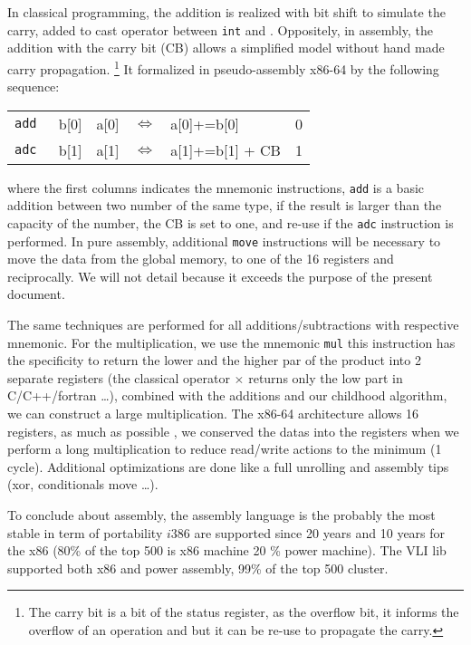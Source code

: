 \documentclass[11pt]{amsart}
\begin{document}
In classical programming, the addition is realized with bit shift to simulate the carry, added to cast operator between  \texttt{int} and . Oppositely, 
in assembly, the addition with the carry bit (CB) allows a simplified model without hand made carry propagation. \footnote{ The carry bit is a bit of the status register, as the overflow bit, 
it informs  the overflow of an operation and but it can be re-use to propagate the carry. }  It formalized in pseudo-assembly x86-64 by the following sequence:
\begin{table}[htdp]
\begin{center}
\begin{tabular}{ l c c c l c}
 \texttt{add }   &  b[0]  & a[0]    & $\Leftrightarrow$ & a[0]+=b[0]            & \tiny{0}  \\ 
 \texttt{adc }   &  b[1]   & a[1]   & $\Leftrightarrow$ & a[1]+=b[1] + CB  & \tiny{1}  \\  
\end{tabular}
\end{center}
\end{table}%
where the first columns indicates the  mnemonic instructions, \texttt{add} is a basic addition between two number of the same type, if the result is larger than the capacity of the number, the CB is set to one,
and re-use if the \texttt{adc} instruction is performed. In pure assembly, additional \texttt{move} instructions will be necessary to move the data from the global memory, to one of the 16 registers and reciprocally.
We will not detail because it exceeds the purpose of the present document. 

The same techniques are performed for all additions/subtractions with respective mnemonic. For the multiplication, we use the mnemonic \texttt{mul} this instruction has the specificity to return the lower and the higher
par of the product into 2 separate registers (the classical operator $\times$ returns only the low part in C/C++/fortran \dots), combined with the additions and our childhood algorithm, we can construct a large multiplication.  
The x86-64 architecture allows 16 registers, as much as possible , we conserved the datas into the registers when we perform a long multiplication to reduce read/write actions to the minimum (1 cycle).
Additional optimizations are done like a full unrolling and assembly tips (xor, conditionals move \dots). 

To conclude about assembly, the assembly language is the probably the most stable in term of portability $i386$ are supported since 20 years and 10 years for the x86 (80\% of the top 500 is x86 machine 20 \% power machine).
The VLI lib supported both x86 and power assembly, 99\% of the top 500 cluster.   
\end{document}
